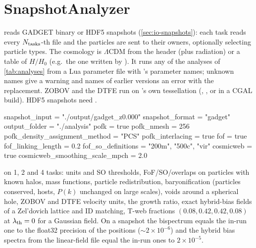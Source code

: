 \section{SnapshotAnalyzer}\label{sec:sa-program}

 reads GADGET binary or HDF5 snapshots (\cref{sec:io-snapshots}): each task reads every $N_{\rm tasks}$-th file and the particles are sent to
their owners, optionally selecting particle types. The cosmology is $\Lambda$CDM from the header (plus radiation) or a table of $H/H_0$ (e.g.\ the one written by
). It runs any of the analyses of \cref{tab:analyses} from a Lua parameter file with 's parameter names; unknown names give a
warning and names of earlier versions an error with the replacement. ZOBOV and the DTFE run on \fml{}'s own tessellation
(,  , or  in a CGAL build). HDF5 snapshots need .

\begin{paramfile}
snapshot_input  = "./output/gadget_z0.000"
snapshot_format = "gadget"
output_folder   = "./analysis"
pofk = true
pofk_nmesh = 256
pofk_density_assignment_method = "PCS"
pofk_interlacing = true
fof = true
fof_linking_length = 0.2
fof_so_definitions = {"200m", "500c", "vir"}
cosmicweb = true
cosmicweb_smoothing_scale_mpch = 2.0
\end{paramfile}

\begin{validation}
 on 1, 2 and 4 tasks: units and SO thresholds, FoF/SO/overlaps on particles with known halos, mass functions, particle redistribution, baryonification
(particles conserved, hosts, $P(k)$ unchanged on large scales), voids around a spherical hole, ZOBOV and DTFE velocity units, the growth ratio, exact hybrid-bias fields of a
Zel'dovich lattice and ID matching, T-web fractions $(0.08,0.42,0.42,0.08)$ at $\lambda_{\rm th}=0$ for a Gaussian field. On a  snapshot the bispectrum equals the
in-run one to the float32 precision of the positions ($\sim2\times10^{-6}$) and the hybrid bias spectra from the linear-field file equal the in-run ones to $2\times10^{-5}$.
\end{validation}
